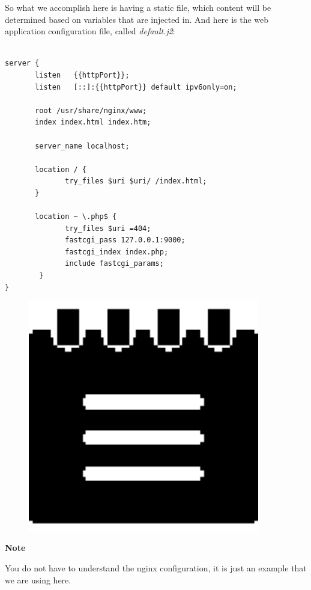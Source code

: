 \documentclass[10pt]{book}
\begin{document}
So what we accomplish here is having a static file, which content will be determined based on 
variables that are injected in. And here is the web application configuration file, called \emph{default.j2}:

\begin{verbatim}
  
server {
       listen   {{httpPort}}; 
       listen   [::]:{{httpPort}} default ipv6only=on; 

       root /usr/share/nginx/www;
       index index.html index.htm;

       server_name localhost;

       location / {
              try_files $uri $uri/ /index.html;
       }
       
       location ~ \.php$ {
              try_files $uri =404;
              fastcgi_pass 127.0.0.1:9000;
              fastcgi_index index.php;
              include fastcgi_params;
      	}
}

\end{verbatim}

\begin{mdframed}[style=noteStyle]
\begin{minipage}[b]{0.05\textwidth}
\begin{figure}[H]
\includegraphics[width=0.9\textwidth]{figures/notes-icon.eps} 
\end{figure}
\end{minipage}  
\begin{minipage}[b]{0.05\textwidth}
\textbf{Note}
\end{minipage}

You do not have to understand the nginx configuration, it is just an example 
that we are using here.

\end{mdframed}
 
\end{document}
